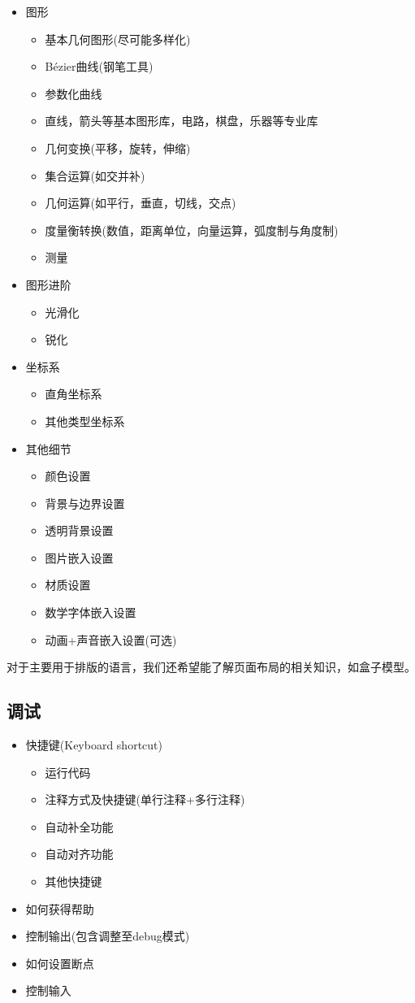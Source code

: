\documentclass[11pt]{amsart}
\begin{document}
\begin{itemize}
\item 图形
\begin{itemize}
	\item 基本几何图形(尽可能多样化)
	\item Bézier曲线(钢笔工具)
	\item 参数化曲线
	\item 直线，箭头等基本图形库，电路，棋盘，乐器等专业库
	\item 几何变换(平移，旋转，伸缩)
	\item 集合运算(如交并补)
	\item 几何运算(如平行，垂直，切线，交点)
	\item 度量衡转换(数值，距离单位，向量运算，弧度制与角度制)
	\item 测量
\end{itemize}
\item 图形进阶
\begin{itemize}
	\item 光滑化
	\item 锐化
\end{itemize}
\item 坐标系
\begin{itemize}
	\item 直角坐标系
	\item 其他类型坐标系
\end{itemize}
\item 其他细节
\begin{itemize}
	\item 颜色设置
	\item 背景与边界设置
	\item 透明背景设置
	\item 图片嵌入设置
	\item 材质设置
	\item 数学字体嵌入设置
	\item 动画+声音嵌入设置(可选)
\end{itemize}
\end{itemize}
对于主要用于排版的语言，我们还希望能了解页面布局的相关知识，如盒子模型。
\subsection{调试}
\begin{itemize}
	\item 快捷键(Keyboard shortcut)
	\begin{itemize}
		\item 运行代码
		\item 注释方式及快捷键(单行注释+多行注释)
		\item 自动补全功能
    	\item 自动对齐功能
		\item 其他快捷键	
	\end{itemize}
	\item 如何获得帮助
	\item 控制输出(包含调整至debug模式)	
	\item 如何设置断点
	\item 控制输入


\end{itemize}
\end{document}
